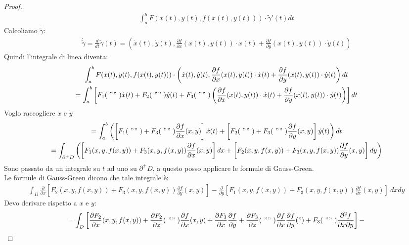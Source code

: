 \documentclass[a4paper, oneside]{article}
\begin{document}
\begin{proof}
\begin{gather*}
    \int_a^b F(x(t), y(t), f(x(t), y(t))) \cdot \widetilde{\gamma}'(t) dt
   \end{gather*}
   Calcoliamo $\dot{\widetilde{\gamma}}$:
   \begin{gather*}
    \dot{\widetilde{\gamma}} = \frac{d}{dt} \widetilde{\gamma} (t) = \left( \dot{x}(t), \dot{y}(t), \frac{\partial f}{\partial x} (x(t), y(t)) \cdot \dot{x}(t) + \frac{\partial f}{\partial y} (x(t), y(t)) \cdot \dot{y}(t) \right)
   \end{gather*}
   Quindi l'integrale di linea diventa:
   \begin{gather*}
    \int_a^b F(x(t), y(t), f(x(t), y(t))) \cdot \left( \dot{x}(t), \dot{y}(t), \frac{\partial f}{\partial x} (x(t), y(t)) \cdot \dot{x}(t) + \frac{\partial f}{\partial y} (x(t), y(t)) \cdot \dot{y}(t) \right) dt\\
    = \int_a^b \left[ F_1( \ "" \ ) \dot{x}(t) + F_2( \ "" \ ) \dot{y}(t) + F_3( \ "" \ ) \left( \frac{\partial f}{\partial x} (x(t), y(t)) \cdot \dot{x}(t) + \frac{\partial f}{\partial y} (x(t), y(t)) \cdot \dot{y}(t) \right) \right] dt\\
   \end{gather*}
   Voglo raccogliere $\dot{x}$ e $\dot{y}$
   \begin{gather*}
      = \int_a^b \left( \left[ F_1( \ "" \ ) + F_3( \ "" \ )\frac{\partial f}{\partial x}(x,y) \right] \dot{x}(t) + \left[ F_2( \ "" \ ) + F_3( \ "" \ )\frac{\partial f}{\partial y}(x,y) \right] \dot{y}(t) \right) dt\\
      = \int_{\partial^+ D} \left( \left[ F_1(x,y,f(x,y)) + F_3(x,y,f(x,y))\frac{\partial f}{\partial x}(x,y) \right] dx + \left[ F_2(x,y,f(x,y)) + F_3(x,y,f(x,y))\frac{\partial f}{\partial y}(x,y) \right] dy \right)
   \end{gather*}
   Sono passato da un integrale su $t$ ad uno su $\partial^+ D$, a questo posso applicare le formule di Gauss-Green.\\
   Le formule di Gauss-Green dicono che tale integrale è:
   \begin{gather*}
    \int_D \frac{\partial}{\partial x}\left[ F_2(x,y,f(x,y)) + F_3(x,y,f(x,y)) \frac{\partial f}{\partial y}(x,y) \right]- \frac{\partial}{\partial y} \left[ F_1(x,y,f(x,y)) + F_3(x,y,f(x,y))\frac{\partial f}{\partial x} (x,y) \right] \ dxdy  
   \end{gather*}
   Devo derivare rispetto a $x$ e $y$:
   \begin{gather*}
    = \int_D \left[ \frac{\partial F_2}{\partial x} ( x,y,f(x,y) ) + \frac{\partial F_2}{\partial z} ( \ "" \ ) \frac{\partial f}{\partial x}(x,y) + \frac{\partial F_3}{\partial x}\frac{\partial f}{\partial y} + \frac{\partial F_3}{\partial z} ( \ "" \ ) \frac{\partial f}{\partial x}\frac{\partial f}{\partial y}(") + F_3( \ "" \ ) \frac{\partial^2 f}{\partial x \partial y} \right] - \\

\end{gather*}
\end{proof}
\end{document}
